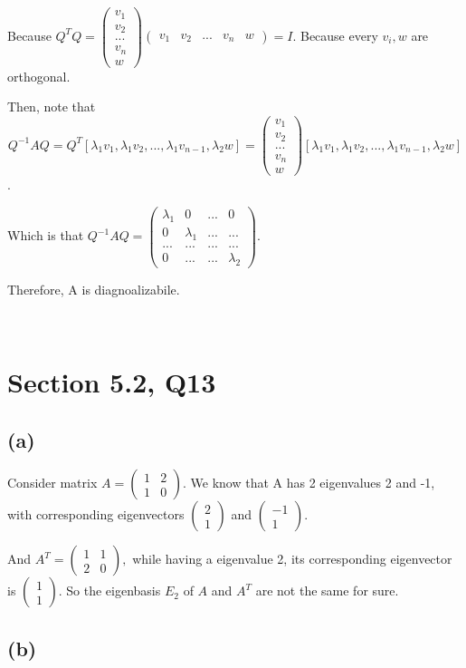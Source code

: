 \documentclass[12pt]{article}%
\begin{document}
Because $Q^{T}Q=\begin{pmatrix}v_1 \\ v_2 \\ ... \\ v_n \\ w\end{pmatrix} \begin{pmatrix}v_1 & v_2 & ... & v_n & w\end{pmatrix}= I.$ Because every $v_i,w$ are orthogonal.

Then, note that $$Q^{-1}AQ=Q^{T}[\lambda_1 v_1,\lambda_1 v_2,...,\lambda_1 v_{n-1}, \lambda_2 w ]=\begin{pmatrix}v_1 \\ v_2 \\ ... \\ v_n \\ w\end{pmatrix} [\lambda_1 v_1,\lambda_1 v_2,...,\lambda_1 v_{n-1}, \lambda_2 w ]$$.

Which is that $Q^{-1}AQ=\begin{pmatrix} \lambda_1&0&...&0\\0&\lambda_1&...&...\\...&...&...&...\\0&...&...&\lambda_2 \end{pmatrix}.$

Therefore, A is diagnoalizabile.


~\ 


\section{Section 5.2, Q13}
\subsection{(a)}
Consider matrix $A =\begin{pmatrix}1&2\\1&0\end{pmatrix}.$ We know that A has 2 eigenvalues 2 and -1, with corresponding eigenvectors $\begin{pmatrix} 2\\ 1\end{pmatrix}$ and $\begin{pmatrix} -1\\1\end{pmatrix}.$

And $A^{T}=\begin{pmatrix}1&1\\2&0\end{pmatrix},$ while having a eigenvalue 2, its corresponding eigenvector is $\begin{pmatrix} 1\\ 1\end{pmatrix}.$ So the eigenbasis $E_2$ of $A$ and $A^{T}$ are not the same for sure.


\subsection{(b)}




~\ 
\end{document}

